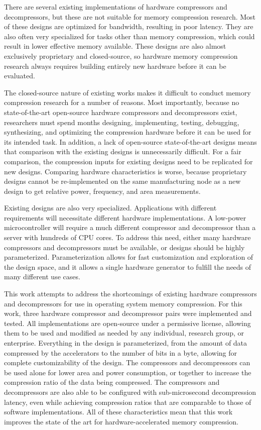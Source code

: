 \documentclass[doublespace,draft,nopageskip]{VTthesis} %
\begin{document}
There are several existing implementations of hardware compressors and decompressors, but these are not suitable for memory compression research. Most of these designs are optimized for bandwidth, resulting in poor latency. They are also often very specialized for tasks other than memory compression, which could result in lower effective memory available. These designs are also almost exclusively proprietary and closed-source, so hardware memory compression research always requires building entirely new hardware before it can be evaluated.

The closed-source nature of existing works makes it difficult to conduct memory compression research for a number of reasons. Most importantly, because no state-of-the-art open-source hardware compressors and decompressors exist, researchers must spend months designing, implementing, testing, debugging, synthesizing, and optimizing the compression hardware before it can be used for its intended task. In addition, a lack of open-source state-of-the-art designs means that comparison with the existing designs is unnecessarily difficult. For a fair comparison, the compression inputs for existing designs need to be replicated for new designs. Comparing hardware characteristics is worse, because proprietary designs cannot be re-implemented on the same manufacturing node as a new design to get relative power, frequency, and area measurements.

Existing designs are also very specialized. Applications with different requirements will necessitate different hardware implementations. A low-power microcontroller will require a much different compressor and decompressor than a server with hundreds of CPU cores. To address this need, either many hardware compressors and decompressors must be available, or designs should be highly parameterized. Parameterization allows for fast customization and exploration of the design space, and it allows a single hardware generator to fulfill the needs of many different use cases.

This work attempts to address the shortcomings of existing hardware compressors and decompressors for use in operating system memory compression. For this work, three hardware compressor and decompressor pairs were implemented and tested. All implementations are open-source under a permissive license, allowing them to be used and modified as needed by any individual, research group, or enterprise. Everything in the design is parameterized, from the amount of data compressed by the accelerators to the number of bits in a byte, allowing for complete customizability of the design. The compressors and decompressors can be used alone for lower area and power consumption, or together to increase the compression ratio of the data being compressed. The compressors and decompressors are also able to be configured with sub-microsecond decompression latency, even while achieving compression ratios that are comparable to those of software implementations. All of these characteristics mean that this work improves the state of the art for hardware-accelerated memory compression.
	
\end{document}
